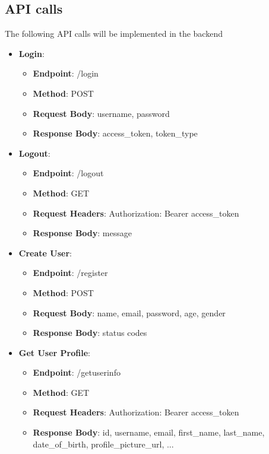 \documentclass{article}
\begin{document}
\subsection{API calls}
The following API calls will be implemented in the backend

\begin{itemize}
\item \textbf{Login}:
\begin{itemize}
\item \textbf{Endpoint}: /login
\item \textbf{Method}: POST
\item \textbf{Request Body}: {username, password}
\item \textbf{Response Body}: {access\_token, token\_type}
\end{itemize} 

\item \textbf{Logout}:
\begin{itemize}
\item \textbf{Endpoint}: /logout
\item \textbf{Method}: GET
\item \textbf{Request Headers}: {Authorization: Bearer access\_token}
\item \textbf{Response Body}: {message}
\end{itemize}

\item \textbf{Create User}:
\begin{itemize}
\item \textbf{Endpoint}: /register
\item \textbf{Method}: POST
\item \textbf{Request Body}: {name, email, password, age, gender}
\item \textbf{Response Body}: {status codes}
\end{itemize}

\item \textbf{Get User Profile}:
\begin{itemize}
\item \textbf{Endpoint}: /getuserinfo
\item \textbf{Method}: GET
\item \textbf{Request Headers}: {Authorization: Bearer access\_token}
\item \textbf{Response Body}: {id, username, email, first\_name, last\_name, date\_of\_birth, profile\_picture\_url, ...}
\end{itemize}


\end{itemize}
\end{document}
